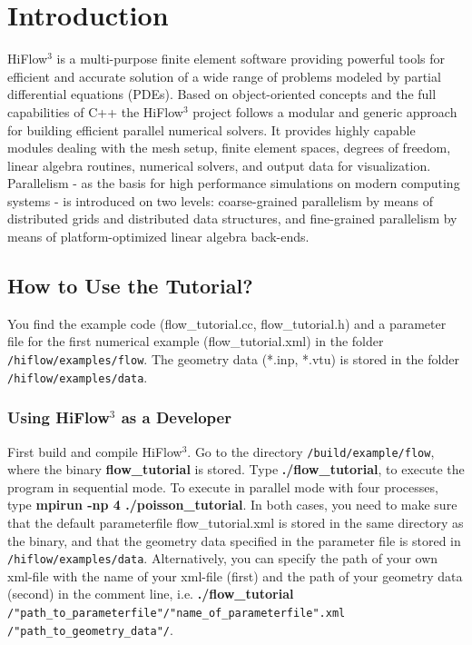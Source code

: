 \documentclass[a4paper, 11pt, twoside]{article}
\begin{document}
\pagestyle{empty}



\tableofcontents

\newpage
\pagestyle{plain}
\vspace{0.5cm}
\section{Introduction}

HiFlow$^3$ is a multi-purpose finite element software providing powerful tools for efficient and accurate solution of a wide range of problems modeled by partial differential equations (PDEs). Based on object-oriented concepts and the full capabilities of C++ the HiFlow$^3$ project follows a modular and generic approach for building efficient parallel numerical solvers. It provides highly capable modules dealing with the mesh setup, finite element spaces, degrees of freedom, linear algebra routines, numerical solvers, and output data for visualization. Parallelism - as the basis for high performance simulations on modern computing systems - is introduced on two levels: coarse-grained parallelism by means of distributed grids and distributed data structures, and fine-grained parallelism by means of platform-optimized linear algebra back-ends.

\subsection{How to Use the Tutorial?}
You find the example code (flow\_tutorial.cc, flow\_tutorial.h) and a parameter file for the first numerical example (flow\_tutorial.xml) in the folder \verb'/hiflow/examples/flow'. The geometry data (*.inp, *.vtu) is stored in the folder \verb'/hiflow/examples/data'.

\subsubsection{Using HiFlow$^3$ as a Developer}\label{sectiondeveloper}
First build and compile HiFlow$^3$. Go to the directory \verb'/build/example/flow', where the binary \textbf{flow\_tutorial} is stored. Type \textbf{./flow\_tutorial}, to execute the program in sequential mode. To execute in parallel mode  with four processes, type \textbf{mpirun -np 4 ./poisson\_tutorial}. In both cases, you need to make sure that the default parameterfile flow\_tutorial.xml is stored in the same directory as the binary, and that the geometry data specified in the parameter file is stored in \verb'/hiflow/examples/data'. Alternatively, you can specify the path of your own xml-file with the name of your xml-file (first) and the path of your geometry data (second) in the comment line, i.e. \textbf{./flow\_tutorial} \verb'/"path_to_parameterfile"/"name_of_parameterfile".xml' \verb'/"path_to_geometry_data"/'.
\end{document}
